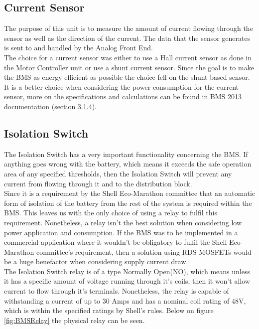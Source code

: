 \subsection{Current Sensor}
The purpose of this unit is to measure the amount of current flowing through the sensor as well as the direction of the current. The data that the sensor generates is sent to and handled by the Analog Front End. \\
The choice for a current sensor was either to use a Hall current sensor as done in the Motor Controller unit or use a shunt current sensor. Since the goal is to make the BMS as energy efficient as possible the choice fell on the shunt based sensor. It is a better choice when considering the power consumption for the current sensor, more on the specifications and calculations can be found in BMS 2013 documentation \cite{BMSDocumentation} (section 3.1.4).

\subsection{Isolation Switch}
The Isolation Switch has a very important functionality concerning the BMS. If anything goes wrong with the battery, which means it exceeds the safe operation area of any specified thresholds, then the Isolation Switch will prevent any current from flowing through it and to the distribution block. \\
Since it is a requirement by the Shell Eco-Marathon committee that an automatic form of isolation of the battery from the rest of the system is required within the BMS. This leaves us with the only choice of using a relay to fulfil this requirement. Nonetheless, a relay isn't the best solution when considering low power application and consumption. If the BMS was to be implemented in a commercial application where it wouldn't be obligatory to fulfil the Shell Eco-Marathon committee's requirement, then a solution using RDS MOSFETs would be a huge benefactor when considering supply current draw.\\
The Isolation Switch relay is of a type Normally Open(NO), which means unless it has a specific amount of voltage running through it's coils, then it won't allow current to flow through it's terminals. Nonetheless, the relay is  capable of withstanding a current of up to 30 Amps and has a nominal coil rating of 48V, which is within the specified ratings by Shell's rules. Below on figure \vref{fig:BMSRelay} the physical relay can be seen.

